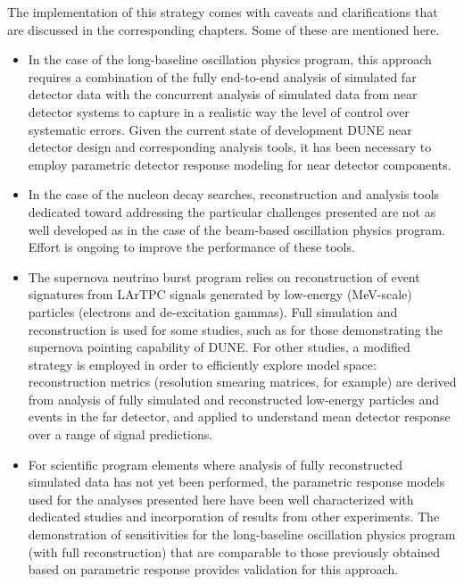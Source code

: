 The implementation of this strategy comes with caveats
and clarifications that are discussed in the corresponding
chapters.  Some of these are mentioned here.
\begin{itemize}
\item In the case of the long-baseline oscillation physics
      program, this approach requires a combination of the 
      fully end-to-end analysis of simulated far detector data
      with the concurrent analysis of simulated data from
      near detector systems to capture in a realistic way 
      the level of 
      control over systematic errors.  Given the 
      current state of development DUNE near detector design and 
      corresponding analysis tools,  it has been necessary to 
      employ parametric detector response modeling for near 
      detector components. 

\item In the case of the nucleon decay searches, 
      reconstruction and analysis tools dedicated toward
      addressing the particular challenges presented are 
      not as well developed as in the case of the 
      beam-based oscillation physics program. Effort is 
      ongoing to improve the performance of these tools. 

\item The supernova neutrino burst program relies on 
reconstruction of event signatures from LArTPC signals 
generated by low-energy (MeV-scale) particles (electrons 
and de-excitation gammas).  Full simulation and reconstruction 
is used for some studies, such as for those demonstrating 
the supernova pointing capability of DUNE.  
For other studies, a modified strategy is employed in order 
to efficiently explore model space:  reconstruction metrics 
(resolution smearing matrices, for example) are derived 
from analysis of fully simulated and reconstructed low-energy 
particles and events in the far detector, and applied to 
understand mean detector response over a range of signal predictions.

\item For scientific program elements where
      analysis of fully reconstructed simulated data has 
      not yet been performed, the parametric response models 
      used for the analyses presented here have
      been well characterized with dedicated studies
      and incorporation of results from other experiments.
      The demonstration of sensitivities for the long-baseline
      oscillation physics program (with full reconstruction) 
      that are comparable to those
      previously obtained based on parametric response
      provides validation for this approach.
\end{itemize}


